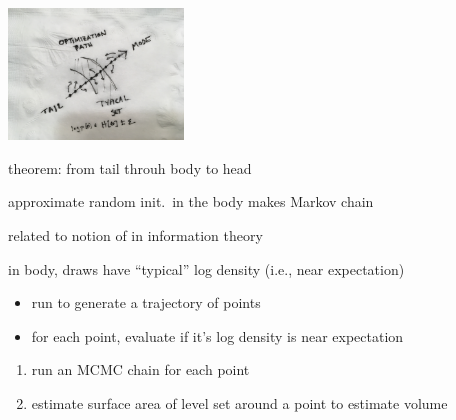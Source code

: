 \documentclass[9pt]{report}
\begin{document}
\vspace*{-2pt}
\begin{center}
  \includegraphics[width=0.35\textwidth]{img/napkin-adapt.jpg}
\end{center}
\vspace*{-4pt}
\begin{subitemize}
\item {} theorem:  from tail throuh body to head
\item approximate random init.\ in the body makes Markov chain 
\item related to notion of  in information theory
  \begin{subitemize}
  \item in body, draws have ``typical'' log density (i.e., near expectation)
  \end{subitemize}
\end{subitemize}


\begin{itemize}
\item run  to generate a trajectory of points
\item for each point, evaluate if it's log density is near expectation 
\end{itemize}
\begin{enumerate}
\item run an MCMC chain for each point
\item estimate surface area of level set around a point to estimate volume
\end{enumerate}
\end{document}

